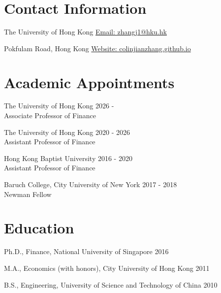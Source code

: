 \documentclass[margin,line]{res}
\newenvironment{list1}{
  \begin{list}{\ding{113}}{%
      \setlength{\itemsep}{0in}
      \setlength{\parsep}{0in} \setlength{\parskip}{0in}
      \setlength{\topsep}{0in} \setlength{\partopsep}{0in} 
      \setlength{\leftmargin}{0.17in}}}{\end{list}}
\begin{document}

\begin{resume}
\thispagestyle{plain} %

\section{\sc Contact Information}
\begin{list1}
	\item[] The University of Hong Kong \hfill \href{mailto: zhangj1@hku.hk}{Email: \color{blue} zhangj1@hku.hk}\\
	\vspace*{-.15in}
	\item[] Pokfulam Road, Hong Kong \hfill \href{https://colinjianzhang.github.io/}{Website: \color{blue} colinjianzhang.github.io}
\end{list1}

\section{\sc Academic Appointments}
\begin{list1}
	\item[] The University of Hong Kong 
	\hfill 2026 -  \\
	\vspace*{.2cm}
	\phantom{th} Associate Professor of Finance		
	\item[] The University of Hong Kong 
	\hfill 2020 - 2026  \\
	\vspace*{.2cm}
	\phantom{th} Assistant Professor of Finance		
	\item[] Hong Kong Baptist University
	\hfill 2016 - 2020 \\
	\vspace*{.2cm}
	\phantom{th} Assistant Professor of Finance	
	\item[] Baruch College, City University of New York
	\hfill 2017 - 2018\\
	\vspace*{.2cm}
	\phantom{th} Newman Fellow	
\end{list1}

\section{\sc Education}
\begin{list1}
	\item[] Ph.D., Finance, National University of Singapore \hfill 2016 
\\
	\vspace*{-.1in}
	\item[] M.A., Economics (with honors), City University of Hong Kong \hfill 2011\\
	\vspace*{-.1in}
	\item[] B.S., Engineering, University of Science and Technology of China \hfill 2010
\end{list1}


\end{resume}
\end{document}
